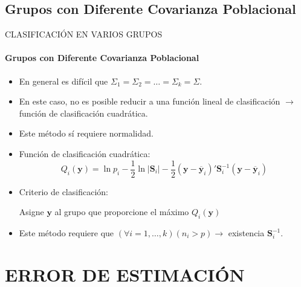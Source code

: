 \subsection{Grupos con Diferente Covarianza Poblacional}
\begin{frame}{CLASIFICACIÓN EN VARIOS GRUPOS}
\framesubtitle{Grupos con Diferente Covarianza Poblacional}
    \begin{itemize}
        \item En general es difícil que $\Sigma_1=\Sigma_2=\dots=\Sigma_k=\Sigma$.
        \item En este caso, no es posible reducir a una función lineal de clasificación $\rightarrow$ función de clasificación cuadrática.
        \item Este método sí requiere normalidad.
        \item Función de clasificación cuadrática:
        \begin{equation}
            Q_{i}(\mathbf{y})=\ln p_i -\dfrac{1}{2}\ln|\mathbf{S}_i|-\dfrac{1}{2}\left(\mathbf{y}-\mathbf{\overbar{y}}_i\right)'\mathbf{S}_i^{-1}\left(\mathbf{y}-\mathbf{\overbar{y}}_i\right)
        \end{equation}
        \item Criterio de clasificación: 
        \begin{center}
            Asigne $\mathbf{y}$ al grupo que proporcione el máximo $Q_i(\mathbf{y})$
        \end{center}
        \item Este método requiere que $(\forall i=1,\dots,k)(n_i>p)\rightarrow$ existencia $\mathbf{S}_i^{-1}$.
    \end{itemize}
\end{frame}

\section{ERROR DE ESTIMACIÓN}
